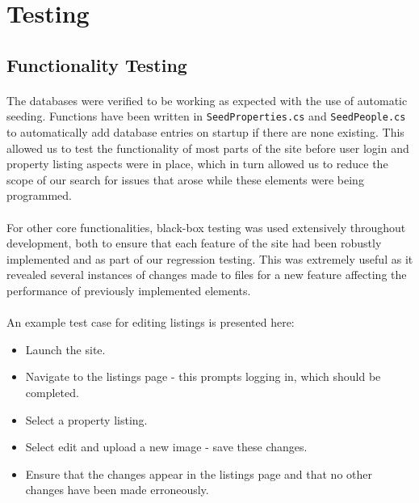 \documentclass{article}
\begin{document}
\FloatBarrier
\section{Testing}
    \subsection{Functionality Testing}
        \paragraph{}
            The databases were verified to be working as expected with the use of automatic seeding.
            Functions have been written in \texttt{SeedProperties.cs} and \texttt{SeedPeople.cs} to automatically add database entries on startup if there are none existing.
            This allowed us to test the functionality of most parts of the site before user login and property listing aspects were in place, which in turn allowed us to reduce the scope of our search for issues that arose while these elements were being programmed.

        \paragraph{}
            For other core functionalities, black-box testing was used extensively throughout development, both to ensure that each feature of the site had been robustly implemented and as part of our regression testing.
            This was extremely useful as it revealed several instances of changes made to files for a new feature affecting the performance of previously implemented elements.

        \paragraph{}

        \paragraph{}
            An example test case for editing listings is presented here:

            \begin{itemize}\itemsep 0pt
                \item Launch the site.
                \item Navigate to the listings page - this prompts logging in, which should be completed.
                \item Select a property listing.
                \item Select edit and upload a new image - save these changes.
                \item Ensure that the changes appear in the listings page and that no other changes have been made erroneously.
            \end{itemize}
\end{document}
